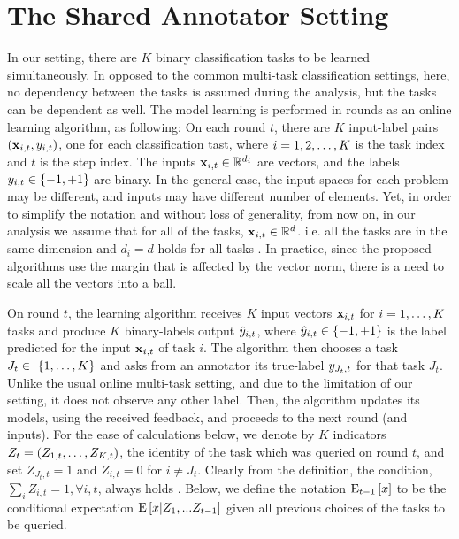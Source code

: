 \chapter{The Shared Annotator Setting}


In our setting, there are $K$  binary classification tasks to be learned simultaneously. 
In opposed to the common multi-task classification settings, here, no dependency between the tasks 
is assumed during the analysis, but the tasks can be dependent as well. 
The model learning is performed in rounds as an online learning algorithm, as following: 
On each round $t$, there are $K$ input-label pairs
$(\mathbf{x}_{i,t},y_{i,t})$, one for each classification tast, where $i=1,2, \ldots , K$ is the task index and $t$ is the 
step index. The inputs $\mathbf{x}_{i,t}\in\mathbb{R}^{d_i}$ are vectors, and the labels  $y_{i,t}\in\{-1,+1\}$ are binary. 
In the general case, the input-spaces for each problem may be different, and inputs may
have different number of elements. Yet, in order to  simplify the notation and without loss of generality,  
from now on, in our analysis we assume that for all of the tasks, $\mathbf{x}_{i,t}\in\mathbb{R}^{d}$. 
i.e. all the tasks are in the same dimension and   $d_i = d$ holds for all tasks . 
In practice, since the proposed algorithms use the margin that is affected by the vector norm, 
there is a need to scale all the vectors into a ball.


On round $t$, the learning algorithm receives $K$ input vectors $\mathbf{x}_{i,t}$
for $i=1 , \ldots , K$ tasks and produce  $K$  binary-labels output $\hat{y}_{i,t}$, where
$\hat{y}_{i,t}\in\{-1,+1\}$ is the label predicted for the input
$\mathbf{x}_{i,t}$ of task $i$. The algorithm then chooses a task $J_t \in\
\{1 , \ldots , K\}$ and asks from an annotator its true-label
$y_{J_t,t}$ for that task $J_t$. Unlike the usual online multi-task setting, and due to the limitation of our
setting, it  does not observe any other label. 
Then, the algorithm updates its models, using the received feedback, and proceeds to the
next round (and inputs).  For the ease of calculations below, we denote
by $K$ indicators $Z_t=\left({ Z_{1,t} , \ldots , Z_{K,t}}\right)$, the
identity of the task which was queried on round $t$, and set
$Z_{J_t,t}=1$ and $Z_{i,t}=0$ for $i\ne J_t$. Clearly from the definition, the condition, $\sum_i
Z_{i,t}=1 ,\forall{i,t}$, always holds . Below, we define the notation ${\rm E}_{t-1}\left[{x}\right]$ to be the
conditional expectation ${\rm E}\left[{x \vert Z_{1},...Z_{t-1}}\right]$ given all
previous choices of the tasks to be queried.


